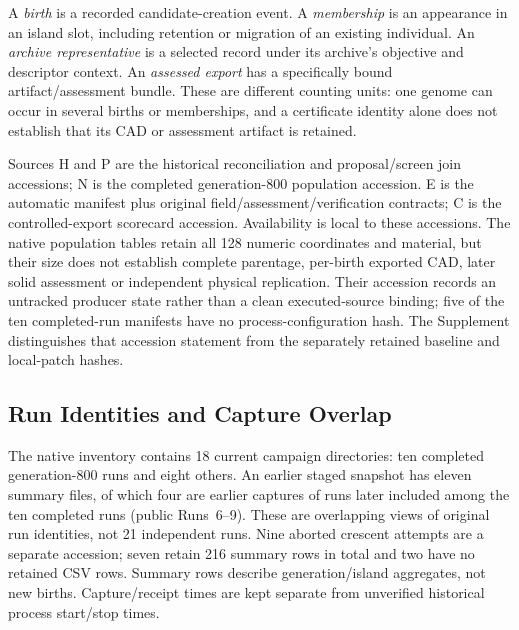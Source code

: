 A \emph{birth} is a recorded candidate-creation event. A \emph{membership} is an appearance in an island slot, including retention or migration of an existing individual. An \emph{archive representative} is a selected record under its archive's objective and descriptor context. An \emph{assessed export} has a specifically bound artifact/assessment bundle. These are different counting units: one genome can occur in several births or memberships, and a certificate identity alone does not establish that its CAD or assessment artifact is retained.

Sources H and P are the historical reconciliation and proposal/screen join accessions; N is the completed generation-800 population accession. E is the automatic manifest plus original field/assessment/verification contracts; C is the controlled-export scorecard accession. Availability is local to these accessions. The native population tables retain all 128 numeric coordinates and material, but their size does not establish complete parentage, per-birth exported CAD, later solid assessment or independent physical replication. Their accession records an untracked producer state rather than a clean executed-source binding; five of the ten completed-run manifests have no process-configuration hash. The Supplement distinguishes that accession statement from the separately retained baseline and local-patch hashes.

\subsection{Run Identities and Capture Overlap}
The native inventory contains 18 current campaign directories: ten completed generation-800 runs and eight others. An earlier staged snapshot has eleven summary files, of which four are earlier captures of runs later included among the ten completed runs (public Runs~6--9). These are overlapping views of original run identities, not 21 independent runs. Nine aborted crescent attempts are a separate accession; seven retain 216 summary rows in total and two have no retained CSV rows. Summary rows describe generation/island aggregates, not new births. Capture/receipt times are kept separate from unverified historical process start/stop times.

